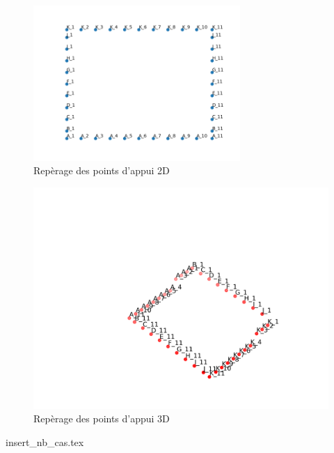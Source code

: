\documentclass{rSIMONIN} %
\begin{document}
\begin{figure}[H] %
    \centering %
    \includegraphics[width=0.7\textwidth]{assets/img/reperage_points_appuis.png} %
    \caption{Repèrage des points d'appui 2D} %
\end{figure}

\begin{figure}[H] %
    \centering %
    \includegraphics[width=\textwidth]{assets/img/reperage_points_appuis_3D_cas_1.png} %
    \caption{Repèrage des points d'appui 3D} %
\end{figure}




{insert_nb_cas.tex}

\newpage
{

    \listoffigures

    \listoftables
}
\end{document}
